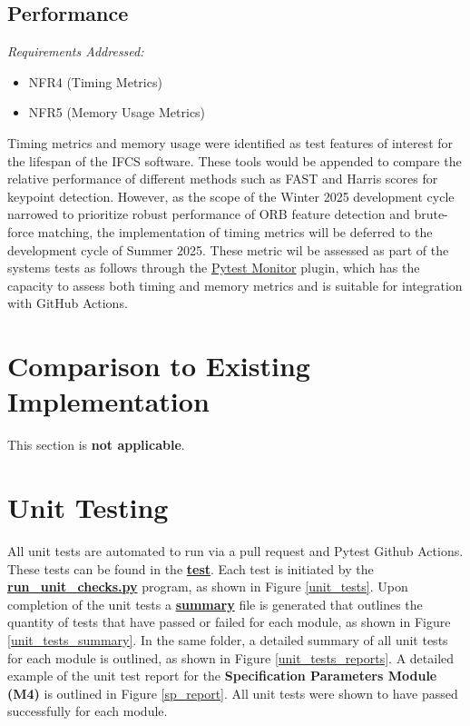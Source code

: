 \documentclass[12pt, titlepage]{article}
\begin{document}
\subsection{Performance}
\textit{Requirements Addressed:} 
\begin{itemize}
\item NFR4 (Timing Metrics)
\item NFR5 (Memory Usage Metrics)
\end{itemize}
Timing metrics and memory usage were identified as test features of interest for the lifespan of the IFCS software. These tools would be appended to compare the relative performance of different methods such as FAST and Harris scores for keypoint detection. However, as the scope of the Winter 2025 development cycle narrowed to prioritize robust performance of ORB feature detection and brute-force matching, the implementation of timing metrics will be deferred to the development cycle of Summer 2025. These metric wil be assessed as part of the systems tests as follows through the \href{https://pypi.org/project/pytest-monitor/}{Pytest Monitor} plugin, which has the capacity to assess both timing and memory metrics and is suitable for integration with GitHub Actions.

	
\section{Comparison to Existing Implementation}	
This section is \textbf{not applicable}.

\section{Unit Testing}
All unit tests are automated to run via a pull request and Pytest Github Actions. These tests can be found in the \href{https://github.com/KiranSingh15/CAS-741-Image-Correspondences/tree/main/test}{\textbf{test}}. Each test is initiated by the \href{https://github.com/KiranSingh15/CAS-741-Image-Correspondences/blob/main/test/run_unit_checks.py}{\textbf{run\_unit\_checks.py}} program, as shown in Figure \ref{unit_tests}. Upon completion of the unit tests a \href{https://github.com/KiranSingh15/CAS-741-Image-Correspondences/blob/main/test/results/UnitTests-60f8e10/2025-04-15_01-38-43/summary.txt}{\textbf{summary}} file is generated that outlines the quantity of tests that have passed or failed for each module, as shown in Figure \ref{unit_tests_summary}. In the same folder, a detailed summary of all unit tests for each module is outlined, as shown in Figure \ref{unit_tests_reports}. A detailed example of the unit test report for the \textbf{Specification Parameters Module (M4)} is outlined in Figure \ref{sp_report}. All unit tests were shown to have passed successfully for each module.
\end{document}
